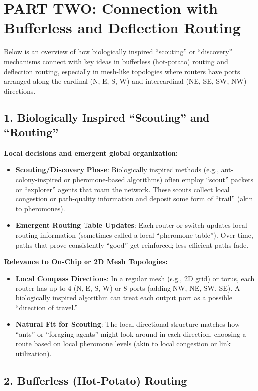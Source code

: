 \documentclass[../../../OAE-SPEC-MAIN.tex]{subfiles}
\begin{document}
\section*{PART TWO: Connection with Bufferless and Deflection Routing}

Below is an overview of how biologically inspired “scouting” or “discovery” mechanisms connect with key ideas in bufferless (hot-potato) routing and deflection routing, especially in mesh-like topologies where routers have ports arranged along the cardinal (N, E, S, W) and intercardinal (NE, SE, SW, NW) directions.

\subsection*{1. Biologically Inspired “Scouting” and “Routing”}

\textbf{Local decisions and emergent global organization:}
\begin{itemize}
    \item \textbf{Scouting/Discovery Phase}: Biologically inspired methods (e.g., ant-colony-inspired or pheromone-based algorithms) often employ “scout” packets or “explorer” agents that roam the network. These scouts collect local congestion or path-quality information and deposit some form of “trail” (akin to pheromones).
    \item \textbf{Emergent Routing Table Updates}: Each router or switch updates local routing information (sometimes called a local “pheromone table”). Over time, paths that prove consistently “good” get reinforced; less efficient paths fade.
\end{itemize}

\textbf{Relevance to On-Chip or 2D Mesh Topologies:}
\begin{itemize}
    \item \textbf{Local Compass Directions}: In a regular mesh (e.g., 2D grid) or torus, each router has up to 4 (N, E, S, W) or 8 ports (adding NW, NE, SW, SE). A biologically inspired algorithm can treat each output port as a possible “direction of travel.”
    \item \textbf{Natural Fit for Scouting}: The local directional structure matches how “ants” or “foraging agents” might look around in each direction, choosing a route based on local pheromone levels (akin to local congestion or link utilization).
\end{itemize}

\subsection*{2. Bufferless (Hot-Potato) Routing}
\end{document}
